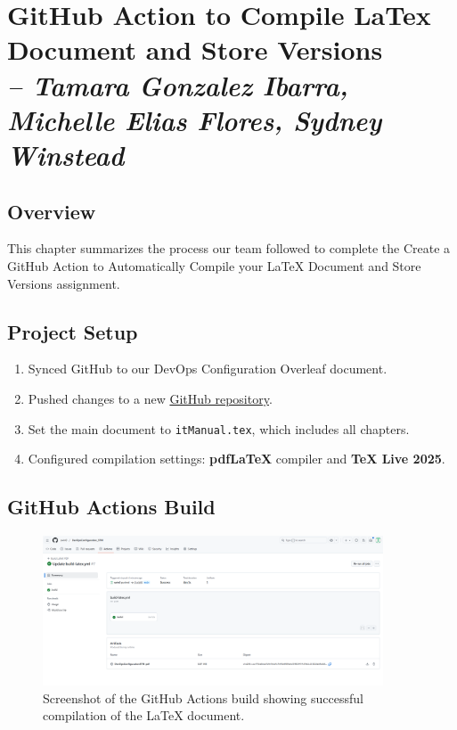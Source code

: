\chapter{GitHub Action to Compile LaTex Document and Store Versions \\
\small{\textit{-- Tamara Gonzalez Ibarra, Michelle Elias Flores, Sydney Winstead}}}
\label{Chapter::itGitHubAction}

\section{Overview}

This chapter summarizes the process our team followed to complete the Create a GitHub Action to Automatically Compile your LaTeX Document and Store Versions assignment. 

\section{Project Setup}

\begin{enumerate}
    \item Synced GitHub to our DevOps Configuration Overleaf document.
    \item Pushed changes to a new \href{https://github.com/swin0/DevOpsConfiguration_STM/actions/runs/18735870456}{GitHub repository}. 
    \item Set the main document to \texttt{itManual.tex}, which includes all chapters.
    \item Configured compilation settings: \textbf{pdfLaTeX} compiler and \textbf{TeX Live 2025}.
\end{enumerate}

\section{GitHub Actions Build}

\begin{figure}[H]
    \centering
    \includegraphics[width=0.9\textwidth]{GitHubActions.PNG}
    \caption{Screenshot of the GitHub Actions build showing successful compilation of the LaTeX document.}
    \label{fig:github_actions_build}
\end{figure}

